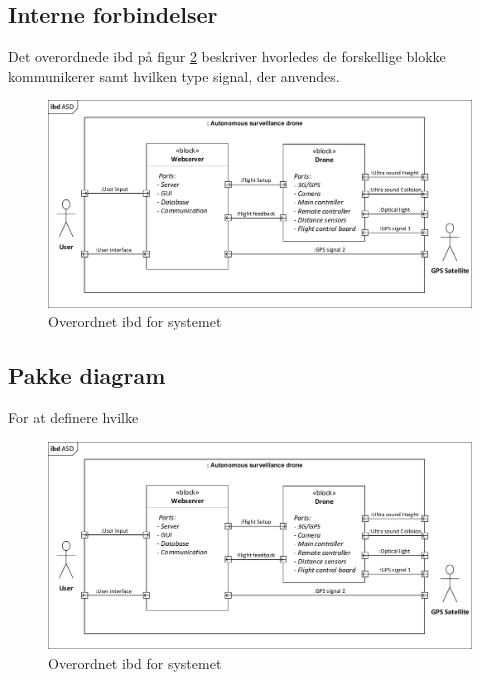 \subsection{Interne forbindelser}

Det overordnede ibd på figur \ref{fig:ibd_asd} beskriver hvorledes de forskellige blokke kommunikerer samt hvilken type signal, der anvendes.

\begin{figure}[H]
	\centering
	\includegraphics[width=1\textwidth]{Billeder/Projektbeskrivelse/ibd1_overordnet.pdf}
	\caption{Overordnet ibd for systemet}
	\label{fig:ibd_asd}
\end{figure}

\subsection{Pakke diagram}

For at definere hvilke

\begin{figure}[H]
	\centering
	\includegraphics[width=1\textwidth]{Billeder/Projektbeskrivelse/ibd1_overordnet.pdf}
	\caption{Overordnet ibd for systemet}
	\label{fig:ibd_asd}
\end{figure}